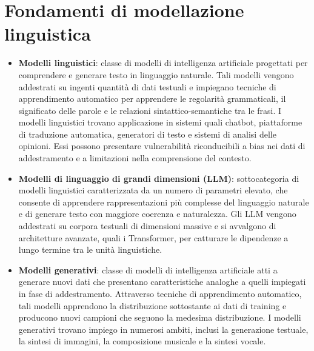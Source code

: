 \section{Fondamenti di modellazione linguistica}
\begin{itemize}
	\item \textbf{Modelli linguistici}: classe di modelli di intelligenza artificiale progettati per comprendere e generare testo in linguaggio naturale. Tali modelli vengono addestrati su ingenti quantità di dati testuali e impiegano tecniche di apprendimento automatico per apprendere le regolarità grammaticali, il significato delle parole e le relazioni sintattico-semantiche tra le frasi. I modelli linguistici trovano applicazione in sistemi quali chatbot, piattaforme di traduzione automatica, generatori di testo e sistemi di analisi delle opinioni. Essi possono presentare vulnerabilità riconducibili a bias nei dati di addestramento e a limitazioni nella comprensione del contesto.
	\item \textbf{Modelli di linguaggio di grandi dimensioni (LLM)}: sottocategoria di modelli linguistici caratterizzata da un numero di parametri elevato, che consente di apprendere rappresentazioni più complesse del linguaggio naturale e di generare testo con maggiore coerenza e naturalezza. Gli LLM vengono addestrati su corpora testuali di dimensioni massive e si avvalgono di architetture avanzate, quali i Transformer, per catturare le dipendenze a lungo termine tra le unità linguistiche.
	\item \textbf{Modelli generativi}: classe di modelli di intelligenza artificiale atti a generare nuovi dati che presentano caratteristiche analoghe a quelli impiegati in fase di addestramento. Attraverso tecniche di apprendimento automatico, tali modelli apprendono la distribuzione sottostante ai dati di training e producono nuovi campioni che seguono la medesima distribuzione. I modelli generativi trovano impiego in numerosi ambiti, inclusi la generazione testuale, la sintesi di immagini, la composizione musicale e la sintesi vocale.
\end{itemize}

